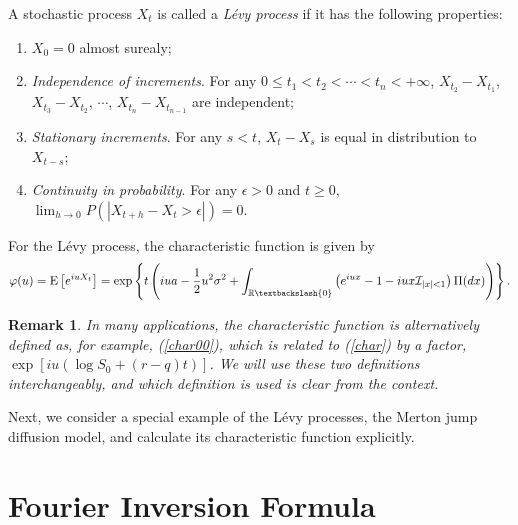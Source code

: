 \documentclass[12pt]{article}
\newtheorem{remark}{Remark}
\begin{document}
    A stochastic process $X_t$ is called a {\it L\'{e}vy process} if it has the following properties:
    \begin{enumerate}[noitemsep]
      \item $X_0=0$ almost surealy;
      \item {\it Independence of increments}. For any $0\le t_1 < t_2 < \cdots < t_n < +\infty$, $X_{t_2}-X_{t_1}$,
            $X_{t_3}-X_{t_2}$, $\cdots$, $X_{t_n}-X_{t_{n-1}}$ are independent;
      \item {\it Stationary increments}. For any $s<t$, $X_t-X_s$ is equal in distribution to $X_{t-s}$;
      \item {\it Continuity in probability}. For any $\epsilon>0$ and $t\ge 0$, $\lim_{h\rightarrow 0}P(|X_{t+h}-X_t>\epsilon|)=0$.
    \end{enumerate}
    For the L\'{e}vy process, the characteristic function is given by
    \begin{equation}
      \varphi(u)={\rm E}\left[e^{iuX_t}\right]=\exp\left\{t\left(iua-\frac{1}{2}u^2\sigma^2
                +\int_{\mathbb{R}\textbackslash\{0\}}\left(e^{iux}-1-iux\mathcal{I}_{|x|<1}\right)\Pi(dx)\right)\right\}.
      \label{char}
    \end{equation}

    \begin{remark}
      In many applications, the characteristic function is alternatively defined as, for example, (\ref{char00}), which is related
      to (\ref{char}) by a factor, $\exp\left[iu(\log S_0 +(r-q)t)\right]$. We will use these two definitions interchangeably, and which
      definition is used is clear from the context.
    \end{remark}

    Next, we consider a special example of the L\'{e}vy processes, the Merton jump diffusion model, and calculate its
    characteristic function explicitly.


\section{Fourier Inversion Formula}
\end{document}
